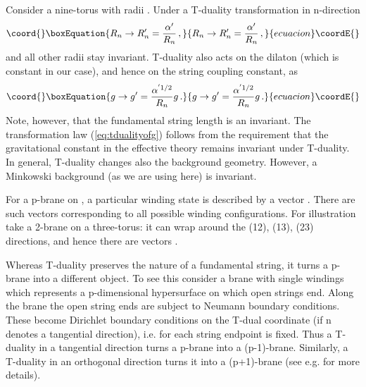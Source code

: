 \documentclass[a4paper,twocolumn,nofootinbib,tightenlines,prd,aps,
               superscriptaddress]{revtex4} %
\providecommand{\al}{\alpha}
\providecommand{\om}{\omega}
\begin{document}
Consider a nine-torus \coordHE{} with radii \coordHE{}. Under
a T-duality transformation in n-direction
\begin{equation}\coord{}\boxEquation{\label{eq:tdualitydef}
    R_n \rightarrow R_n'=\frac{\al'}{R_n} \, ,
}{R_n \rightarrow R_n'=\frac{\al'}{R_n} \, ,
}{ecuacion}\coordE{}\end{equation}
and  all other radii stay invariant. T-duality also acts on the
dilaton (which is  constant in our case), and hence on the string
coupling constant, as
\begin{equation}\coord{}\boxEquation{ \label{eq:tdualityofg}
    g \rightarrow g'=\frac{\al^{'1/2}}{R_n}g \, .
}{ g \rightarrow g'=\frac{\al^{'1/2}}{R_n}g \, .
}{ecuacion}\coordE{}\end{equation}
Note, however, that the fundamental string length \myHighlight{$l_s \equiv
\al^{'1/2}$}\coordHE{} is an invariant. The transformation law
(\ref{eq:tdualityofg}) follows from the requirement that the
gravitational constant in the effective theory remains invariant
under T-duality. In general, T-duality changes also the background
geometry. However, a Minkowski background (as we are using here)
is invariant.

For a p-brane on \coordHE{}, a particular winding state is described by
a vector \myHighlight{$\om = (\om_1,\cdots,\om_9)$}\coordHE{}. There are \coordHE{} such vectors corresponding to all possible winding
configurations. For illustration take a 2-brane on a three-torus:
it can wrap around the (12), (13), (23) directions, and hence
there are \coordHE{} vectors \myHighlight{$\om = (\om_1,\om_2,0),
\om=(\om_1,0,\om_3), \om=(0,\om_2,\om_3)$}\coordHE{}.

Whereas T-duality preserves the nature of a fundamental string, it
turns a p-brane into a different object. To see this consider a
brane with \coordHE{} single windings \myHighlight{$\om=(1,\cdots,1,0,\cdots,0)$}\coordHE{} which
represents a p-dimensional hypersurface on which open strings end.
Along the brane the open string ends are subject to Neumann
boundary conditions. These become Dirichlet boundary conditions on
the T-dual coordinate \coordHE{} (if n denotes a tangential
direction), i.e. for each string endpoint \coordHE{} is fixed. Thus a
T-duality in a tangential direction turns a p-brane into a
(p-1)-brane. Similarly, a T-duality in an orthogonal direction
turns it into a (p+1)-brane (see e.g. \cite{Polchinski:1998rr} for
more details).
\end{document}

